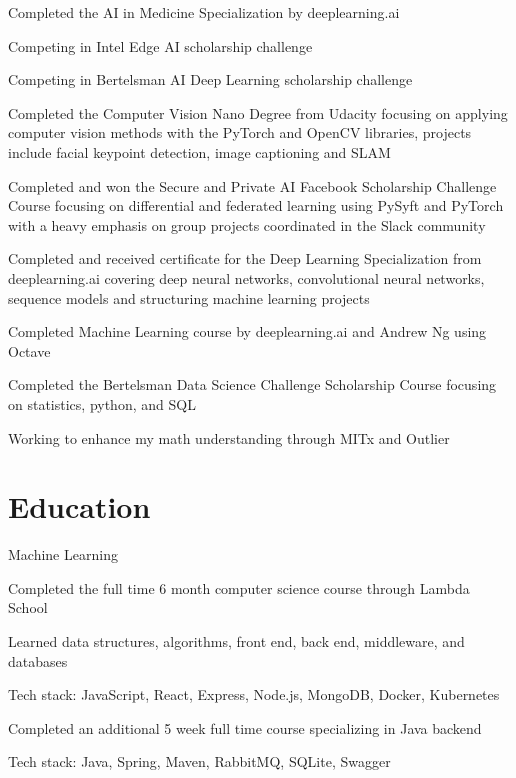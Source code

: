 \documentclass[letterpaper]{resume}
\begin{document}
\begin{compactitem}
\item Completed the AI in Medicine Specialization by deeplearning.ai
\item Competing in Intel Edge AI scholarship challenge
\item Competing in Bertelsman AI Deep Learning scholarship challenge
\item Completed the Computer Vision Nano Degree from Udacity focusing on applying computer vision methods with the PyTorch and OpenCV libraries, projects include facial keypoint detection, image captioning and SLAM
\item Completed and won the Secure and Private AI Facebook Scholarship Challenge Course focusing on differential and federated learning using PySyft and PyTorch with a heavy emphasis on group projects coordinated in the Slack community
\item Completed and received certificate for the Deep Learning Specialization from deeplearning.ai covering deep neural networks, convolutional neural networks, sequence models and structuring machine learning projects
\item Completed Machine Learning course by deeplearning.ai and Andrew Ng using Octave
\item Completed the Bertelsman Data Science Challenge Scholarship Course focusing on statistics, python, and SQL
\item Working to enhance my math understanding through MITx and Outlier
\end{compactitem}

\section{Education}

\begin{compactitem}[\null]
\item Machine Learning
\end{compactitem}

\begin{compactitem}
\item Completed the full time 6 month computer science course through Lambda School
\item Learned data structures, algorithms, front end, back end, middleware, and databases
\item Tech stack: JavaScript, React, Express, Node.js, MongoDB, Docker, Kubernetes
\item Completed an additional 5 week full time course specializing in Java backend
\item Tech stack: Java, Spring, Maven, RabbitMQ, SQLite, Swagger
\end{compactitem}
\end{document}
